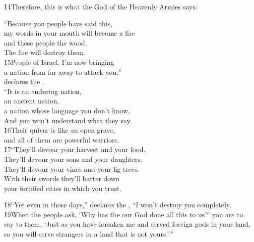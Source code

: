 \v{14}Therefore, this is what the  God of the Heavenly Armies says:

\begin{poetry}
\poeml ``Because you people have said this, \\
\poemll    my words in your mouth will become a fire \\
\poemlll       and these people the wood. \\
\poemll    The fire will destroy them. \\
\poeml \v{15}People of Israel, I'm now bringing \\
\poemll    a nation from far away to attack you,'' \\
\poemlll       declares the . \\
\poeml ``It is an enduring nation, \\
\poemll    an ancient nation, \\
\poeml a nation whose language you don't know. \\
\poemll    And you won't understand what they say. \\
\poeml \v{16}Their quiver is like an open grave, \\
\poemll    and all of them are powerful warriors. \\
\poeml \v{17}``They'll devour your harvest and your food. \\
\poemll    They'll devour your sons and your daughters. \\
\poemlll       They'll devour your vines and your fig trees. \\
\poeml With their swords they'll batter down \\
\poemll    your fortified cities in which you trust.
\end{poetry}

\v{18}``Yet even in those days,'' declares the , ``I won't destroy you completely. \v{19}When the people ask, `Why has the  our God done all this to us?' you are to say to them, `Just as you have forsaken me and served foreign gods in your land, so you will serve strangers in a land that is not yours.'\,''

